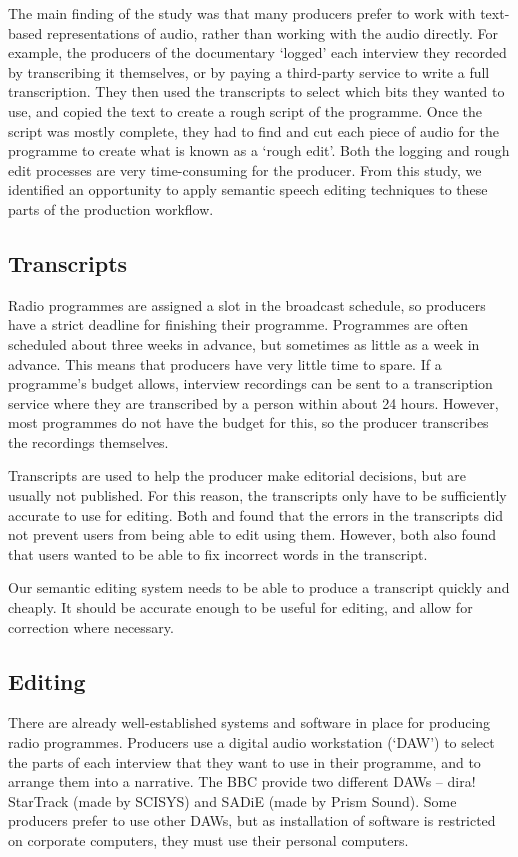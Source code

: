 The main finding of the study was that many producers prefer to work with text-based representations of audio, rather
than working with the audio directly. For example, the producers of the documentary `logged' each interview they
recorded by transcribing it themselves, or by paying a third-party service to write a full transcription.  They then
used the transcripts to select which bits they wanted to use, and copied the text to create a rough script of the
programme. Once the script was mostly complete, they had to find and cut each piece of audio for the programme to
create what is known as a `rough edit'.  Both the logging and rough edit processes are very time-consuming for the
producer.  From this study, we identified an opportunity to apply semantic speech editing techniques to these parts of
the production workflow.

\subsection{Transcripts}
Radio programmes are assigned a slot in the broadcast schedule, so producers have a strict deadline for finishing their
programme. Programmes are often scheduled about three weeks in advance, but sometimes as little as a week in advance.
This means that producers have very little time to spare. If a programme's budget allows, interview recordings can be
sent to a transcription service where they are transcribed by a person within about 24 hours. However, most programmes
do not have the budget for this, so the producer transcribes the recordings themselves.

Transcripts are used to help the producer make editorial decisions, but are usually not published. For this reason, the
transcripts only have to be sufficiently accurate to use for editing. Both \citet{Whittaker2004} and
\citet{Sivaraman2016} found that the errors in the transcripts did not prevent users from being able to edit using
them. However, both also found that users wanted to be able to fix incorrect words in the transcript.

Our semantic editing system needs to be able to produce a transcript quickly and cheaply. It should be accurate enough
to be useful for editing, and allow for correction where necessary.

\subsection{Editing}
There are already well-established systems and software in place for producing radio programmes. Producers use a
digital audio workstation (`DAW') to select the parts of each interview that they want to use in their programme, and
to arrange them into a narrative. The BBC provide two different DAWs -- dira!  StarTrack (made by SCISYS) and SADiE
(made by Prism Sound). Some producers prefer to use other DAWs, but as installation of software is restricted on
corporate computers, they must use their personal computers.

